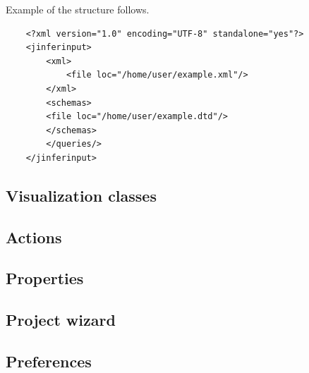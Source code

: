 \documentclass[a4paper,10pt,oneside]{article}
\begin{document}
\noindent Example of the structure follows.
\begin{verbatim}
	<?xml version="1.0" encoding="UTF-8" standalone="yes"?>
	<jinferinput>
	    <xml>
	        <file loc="/home/user/example.xml"/>
	    </xml>
	    <schemas>
		<file loc="/home/user/example.dtd"/>
	    </schemas>
	    </queries/>
	</jinferinput>
\end{verbatim}

\subsection{Visualization classes}



\subsection{Actions}

\subsection{Properties}

\subsection{Project wizard}

\subsection{Preferences}


\nocite{*}
\newpage


\end{document}
